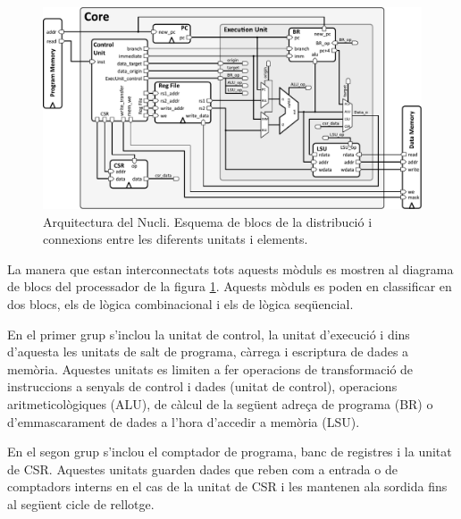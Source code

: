\documentclass[10pt,a4paper,twocolumn,twoside]{article}
\begin{document}
    \label{sec:arch}
    \begin{figure}[!ht]
    \centering
    	\includegraphics[width=0.9\linewidth]{pdf/arch_RiscV.pdf}
        \caption{Arquitectura del Nucli. Esquema de blocs de la distribució i connexions entre les diferents unitats i elements.}
        \label{fig:core_arch}
    \end{figure}
    

    
    La manera que estan interconnectats tots aquests mòduls es mostren al diagrama de blocs del processador de la figura \ref{fig:core_arch}. Aquests mòduls es poden en classificar en dos blocs, els de lògica combinacional i els de lògica seqüencial. 
    
    En el primer grup s'inclou la unitat de control, la unitat d'execució i dins d'aquesta les unitats de salt de programa, càrrega i escriptura de dades a memòria. Aquestes unitats es limiten a fer operacions de transformació de instruccions a senyals de control i dades (unitat de control), operacions aritmeticològiques (ALU), de càlcul de la següent adreça de programa (BR) o d'emmascarament de dades a l'hora d'accedir a memòria (LSU).
    
    En el segon grup s'inclou el comptador de programa, banc de registres i la unitat de CSR.
    Aquestes unitats guarden dades que reben com a entrada o de comptadors interns en el cas de la unitat de CSR i les mantenen ala sordida fins al següent cicle de rellotge. 
    
\end{document}
